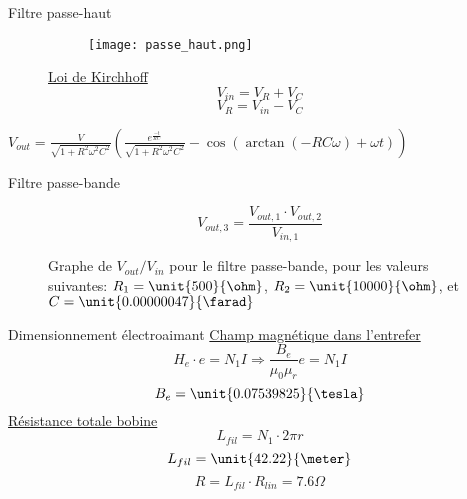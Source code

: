 \documentclass[pdf]{beamer}
\begin{document}
\begin{frame}{Filtre passe-haut}

	\begin{figure}[ht]
\begin{figure}[ht!]
    \centering
    \texttt{[image: passe\_haut.png]}
\end{figure}
\endminipage\hfill
{}
\underline{Loi de Kirchhoff}
$$V_{in} = V_R + V_C$$
$$V_R = V_{in} - V_C$$
\endminipage\hfill
\end{figure}
$V_{out} = \frac{V}{\sqrt{1 + R^2\omega^2C^2}}
\left(\frac{e^{\frac{-t}{RC}}}{\sqrt{1 + R^2\omega^2C^2}} - \cos(\arctan(-RC\omega) + \omega t) \right)$

\end{frame}

\begin{frame}{Filtre passe-bande}

$$V_{out,3} = \frac{V_{out,1} \cdot V_{out,2}}{V_{in,1}}$$

\begin{figure}[ht!]
\centering
{}
\caption{Graphe de $V_{out} / V_{in}$ pour le filtre passe-bande, pour les valeurs
suivantes: $R_{1} = \unit{500}{\ohm}$, $R_{2} = \unit{10000}{\ohm}$, et
$C = {\unit{0.00000047}{\farad}}$}
\label{pbf_ratio}
\end{figure}
\end{frame}
\begin{frame}{Dimensionnement électroaimant}
\underline{Champ magnétique dans l'entrefer}
$$H_e \cdot e = N_1 I \Rightarrow \frac{B_e}{\mu_0 \mu_r} e = N_1 I$$
$$B_e = \unit{0.07539825}{\tesla}$$
\underline{Résistance totale bobine}
$$L_{fil} = N_1 \cdot 2\pi r$$ 
$$L_{fil} = \unit{42.22}{\meter}$$
$$R = L_{fil} \cdot R_{lin} = 7.6 \Omega$$
\end{frame}
\end{document}
